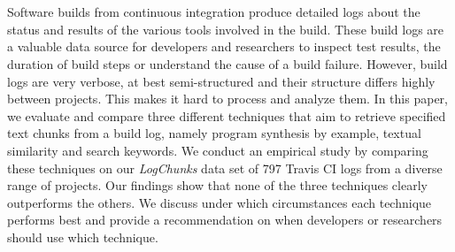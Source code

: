 \documentclass[\myrootdir/main.tex]{subfiles}
\begin{document}
\chapter*{\myAbstractTitle}

Software builds from continuous integration produce detailed logs about the status and results of the various tools involved in the build.
These build logs are a valuable data source for developers and researchers to inspect test results, the duration of build steps or understand the cause of a build failure.
However, build logs are very verbose, at best semi-structured and their structure differs highly between projects.
This makes it hard to process and analyze them.
In this paper, we evaluate and compare three different techniques that aim to retrieve specified text chunks from a build log, namely program synthesis by example, textual similarity and search keywords.
We conduct an empirical study by comparing these techniques on our \emph{LogChunks} data set of 797 Travis CI logs from a diverse range of projects.
Our findings show that none of the three techniques clearly outperforms the others.
We discuss under which circumstances each technique performs best and provide a recommendation on when developers or researchers should use which technique.
\end{document}
